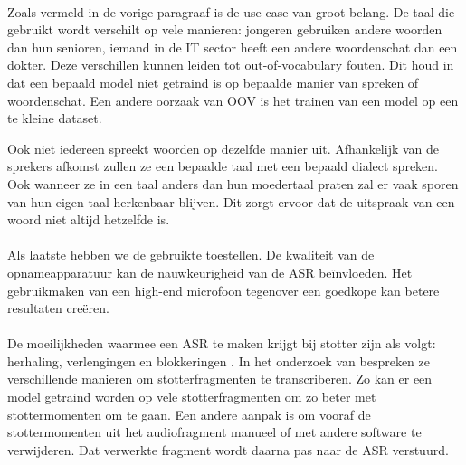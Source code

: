 \paragraph{}%
Zoals vermeld in de vorige paragraaf is de use case van groot belang. De taal die gebruikt wordt verschilt op vele manieren: jongeren gebruiken andere woorden dan hun senioren, iemand in de IT sector heeft een andere woordenschat dan een dokter. Deze verschillen kunnen leiden tot out-of-vocabulary fouten. Dit houd in dat een bepaald model niet getraind is op bepaalde manier van spreken of woordenschat. Een andere oorzaak van OOV is het trainen van een model op een te kleine dataset. \autocite{Alharbi2021}

Ook niet iedereen spreekt woorden op dezelfde manier uit. Afhankelijk van de sprekers afkomst zullen ze een bepaalde taal met een bepaald dialect spreken. Ook wanneer ze in een taal anders dan hun moedertaal praten zal er vaak sporen van hun eigen taal herkenbaar blijven. Dit zorgt ervoor dat de uitspraak van een woord niet altijd hetzelfde is. \autocite{Alharbi2021}

\paragraph{}%
Als laatste hebben we de gebruikte toestellen. De kwaliteit van de opnameapparatuur kan de nauwkeurigheid van de ASR beïnvloeden. Het gebruikmaken van een high-end microfoon tegenover een goedkope kan betere resultaten creëren. \autocite{Alharbi2021}


\paragraph{}%
De moeilijkheden waarmee een ASR te maken krijgt bij stotter zijn als volgt: herhaling, verlengingen en blokkeringen \autocite{Manjula2019}. In het onderzoek van \textcite{Suryaa2017} bespreken ze verschillende manieren om stotterfragmenten te transcriberen. Zo kan er een model getraind worden op vele stotterfragmenten om zo beter met stottermomenten om te gaan. Een andere aanpak is om vooraf de stottermomenten uit het audiofragment manueel of met andere software te verwijderen. Dat verwerkte fragment wordt daarna pas naar de ASR verstuurd.


\subsection{} \label{ssec:Natural Language Classifier}%


